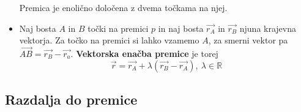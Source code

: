 \documentclass[a4paper,12pt]{article}
\begin{document}
\begin{itemize}
Premica je enolično določena z dvema točkama na njej. 

\item Naj bosta $A$ in $B$ točki na premici $p$ in naj bosta $\vec{r_A}$ in $\vec{r_B}$ njuna krajevna vektorja. Za točko na premici si lahko vzamemo $A$, za smerni vektor pa $\overrightarrow{AB}=\vec{r_B} - \vec{r_a}$. \textbf{Vektorska enačba premice} je torej $$ \vec{r}=\vec{r_A}+\lambda(\vec{r_B} - \vec{r_A}),~\lambda \in \mathbb{R}$$

\end{itemize}

\newpage

\begin{center}
\subsection{Razdalja do premice}
\end{center}
\end{document}
